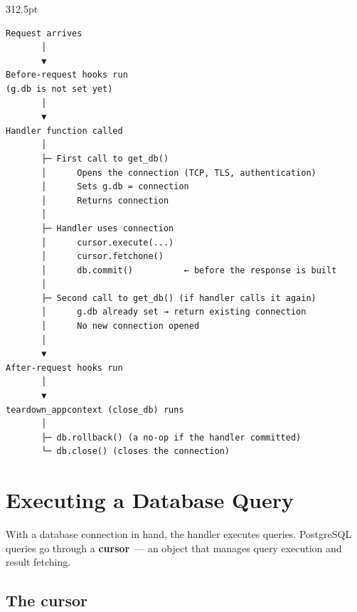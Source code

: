 \begin{diagrambox}[short]{312.5pt}
\begin{Verbatim}[fontsize=\fontsize{9.0}{8.55}\selectfont]
Request arrives
       │
       ▼
Before-request hooks run
(g.db is not set yet)
       │
       ▼
Handler function called
       │
       ├─ First call to get_db()
       │      Opens the connection (TCP, TLS, authentication)
       │      Sets g.db = connection
       │      Returns connection
       │
       ├─ Handler uses connection
       │      cursor.execute(...)
       │      cursor.fetchone()
       │      db.commit()          ← before the response is built
       │
       ├─ Second call to get_db() (if handler calls it again)
       │      g.db already set → return existing connection
       │      No new connection opened
       │
       ▼
After-request hooks run
       │
       ▼
teardown_appcontext (close_db) runs
       │
       ├─ db.rollback() (a no-op if the handler committed)
       └─ db.close() (closes the connection)
\end{Verbatim}
\end{diagrambox}

\setcounter{section}{3}
\section{Executing a Database Query}\label{33-logic-execution:334-executing-a-database-query}

With a database connection in hand, the handler executes queries. PostgreSQL queries go through a \textbf{cursor}~--- an object that manages query execution and result fetching.

\subsection*{The cursor}\label{33-logic-execution:the-cursor}

\begin{codebox}[short]

\begin{Shaded}
\begin{Highlighting}[]
\OperatorTok{=}
\OperatorTok{=}

\end{Highlighting}
\end{Shaded}

\end{codebox}

